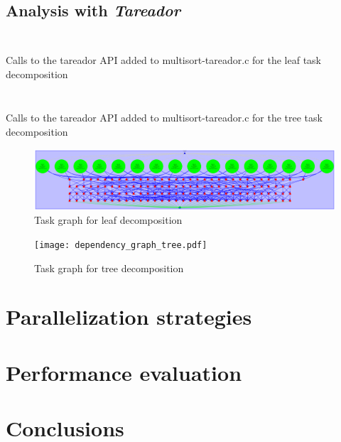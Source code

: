 \subsection{Analysis with \emph{Tareador}}

\begin{listing}[H]
\inputminted[firstline=20,lastline=31]{c}{sources/multisort-tareador-leaf.c}
\inputminted[firstline=33,lastline=51]{c}{sources/multisort-tareador-leaf.c}
\caption{Calls to the tareador API added to multisort-tareador.c for the leaf task decomposition}
\label{listing:tareador_leaf}
\end{listing}

\begin{listing}[H]
\inputminted[firstline=20,lastline=31]{c}{sources/multisort-tareador-tree.c}
\inputminted[firstline=33,lastline=51]{c}{sources/multisort-tareador-tree.c}
\caption{Calls to the tareador API added to multisort-tareador.c for the tree task decomposition}
\label{listing:tareador_leaf}
\end{listing}

\begin{figure}[H]
\centering
\includegraphics[width=\textwidth]{dependency_graph_leaf.pdf}
\caption{Task graph for leaf decomposition}
\label{fig:tar_tasks_leaf}
\end{figure}

\begin{figure}[H]
\centering
\texttt{[image: dependency\_graph\_tree.pdf]}
\caption{Task graph for tree decomposition}
\label{fig:tar_tasks_tree}
\end{figure}

\section{Parallelization strategies}%
\label{sec:par_strats}

\section{Performance evaluation}%
\label{sec:perf_eval}

\section{Conclusions}%
\label{sec:conclusions}


